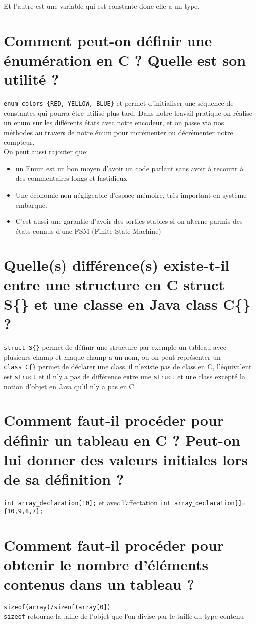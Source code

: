 Et l'autre est une variable qui est constante donc elle a un type.  


\section{Comment peut-on définir une énumération en C ? Quelle est son utilité ?}
\texttt{enum colors \{RED, YELLOW, BLUE\}} et permet d'initialiser une séquence de constantes qui pourra être utilisé plus tard. Dans notre travail pratique on réalise un enum sur les différents états avec notre encodeur, et on passe via nos méthodes au travers de notre énum pour incrémenter ou décrémenter notre compteur.\\

On peut aussi rajouter que:
\begin{itemize}
   \item un Enum est un bon moyen d'avoir un code parlant sans avoir à recourir à des commentaires longs et fastidieux.
   \item Une économie non négligeable d'espace mémoire, très important en système embarqué.
   \item C'est aussi une garantie d'avoir des sorties stables si on alterne parmis des états connus d'une FSM (Finite State Machine)\\
\end{itemize}


\section{Quelle(s) différence(s) existe-t-il entre une structure en C struct S\{\} et une classe en Java class C\{\} ?}
\texttt{struct S\{\}} permet de définir une structure par exemple un tableau avec plusieurs champ et chaque champ a un nom, ou on peut représenter un \\
\texttt{class C\{\}} permet de déclarer une class, il n'existe pas de class en C, l'équivalent est \texttt{struct} et il n'y a pas de différence entre une \texttt{struct} et une class excepté la notion d'objet en Java qu'il n'y a pas en C

\section{Comment faut-il procéder pour définir un tableau en C ? Peut-on lui donner des valeurs initiales lors de sa définition ?}
\texttt{int array\_declaration[10];} et avec l'affectation \texttt{int array\_declaration[]=\{10,9,8,7\};}

\section{Comment faut-il procéder pour obtenir le nombre d'éléments contenus dans un tableau ?}
\texttt{sizeof(array)/sizeof(array[0])}\\ \texttt{sizeof} retourne la taille de l'objet que l'on divise par le taille du type contenu

